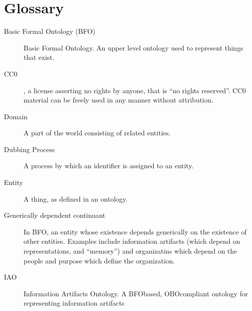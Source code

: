 \documentclass[letterpaper,10pt,english]{sphinxmanual}
\begin{document}
\chapter{Glossary}
\label{\detokenize{glossary:glossary}}\label{\detokenize{glossary:id1}}\label{\detokenize{glossary::doc}}\begin{description}
\item[{Basic Formal Ontology (BFO)\label{\detokenize{glossary:term-BFO}}}] \leavevmode
\sphinxAtStartPar
Basic Formal Ontology.  An upper level ontology used to represent things that exist.

\item[{CC0\label{\detokenize{glossary:term-CC0}}}] \leavevmode
\sphinxAtStartPar
{},
a license asserting no rights by anyone, that is “no rights reserved”.  CC0 material
can be freely used in any manner without attribution.

\item[{Domain\label{\detokenize{glossary:term-Domain}}}] \leavevmode
\sphinxAtStartPar
A part of the world consisting of related entities.

\item[{Dubbing Process\label{\detokenize{glossary:term-Dubbing-Process}}}] \leavevmode
\sphinxAtStartPar
A process by which an identifier is assigned to an entity.

\item[{Entity\label{\detokenize{glossary:term-Entity}}}] \leavevmode
\sphinxAtStartPar
A thing, as defined in an ontology.

\item[{Generically dependent continuant\label{\detokenize{glossary:term-Generically-dependent-continuant}}}] \leavevmode
\sphinxAtStartPar
In BFO, an entity whose existence depends generically on the existence of other
entities.  Examples include information artifacts (which depend on representations,
and “memory”) and organizatins which depend on the people and purpose which define
the organization.

\item[{IAO\label{\detokenize{glossary:term-IAO}}}] \leavevmode
\sphinxAtStartPar
Information Artifacts Ontology.  A BFO\sphinxhyphen{}based, OBO\sphinxhyphen{}compliant ontology for
representing information artifacts


\end{description}
\end{document}
